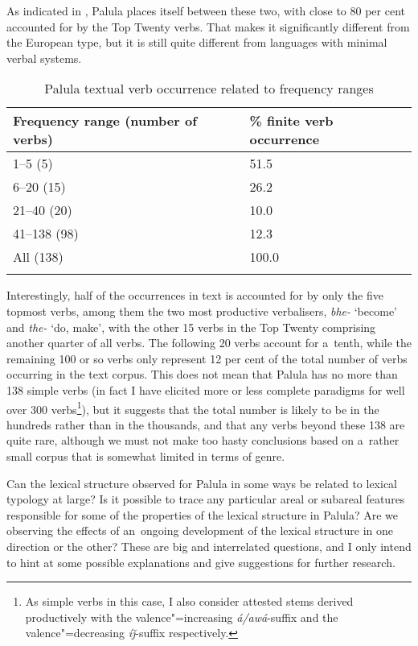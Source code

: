 As indicated in , Palula places itself between these two, with close to 80 per cent accounted for by the Top Twenty verbs. That makes it significantly different from the European type, but it is still quite different from languages with minimal verbal systems. 


\begin{table}[ht]
\caption{Palula textual verb occurrence related to frequency ranges}

\begin{tabularx}{\textwidth}{ Q P{50mm} }
\lsptoprule
Frequency range (number of verbs) &
\% finite verb occurrence\\--5 (5) &
\phantom{1}51.5\\
6--20 (15) &
\phantom{1}26.2\\
21--40 (20) &
\phantom{1}10.0\\
41--138 (98) &
\phantom{1}12.3\\
All (138) &
100.0\\\lspbottomrule
\end{tabularx}
\label{tab:8-2}
\end{table}


Interestingly, half of the occurrences in text is accounted for by only the five topmost verbs, among them the two most productive verbalisers, \textit{bhe-} `become' and \textit{the-} `do, make', with the other 15 verbs in the Top Twenty comprising another quarter of all verbs. The following 20 verbs account for a~tenth, while the remaining 100 or so verbs only represent 12 per cent of the total number of verbs occurring in the text corpus. This does not mean that Palula has no more than 138 simple verbs (in fact I have elicited more or less complete paradigms for well over 300 verbs\footnote{As simple verbs in this case, I also consider attested stems derived productively with the valence"=increasing \textit{á/awá}-suffix and the valence"=decreasing \textit{íǰ}-suffix respectively.}), but it suggests that the total number is likely to be in the hundreds rather than in the thousands, and that any verbs beyond these 138 are quite rare, although we must not make too hasty conclusions based on a~rather small corpus that is somewhat limited in terms of genre.



Can the lexical structure observed for Palula in some ways be related to lexical typology at large? Is it possible to trace any particular areal or subareal features responsible for some of the properties of the lexical structure in Palula? Are we observing the effects of an~ongoing development of the lexical structure in one direction or the other? These are big and interrelated questions, and I only intend to hint at some possible explanations and give suggestions for further research.




